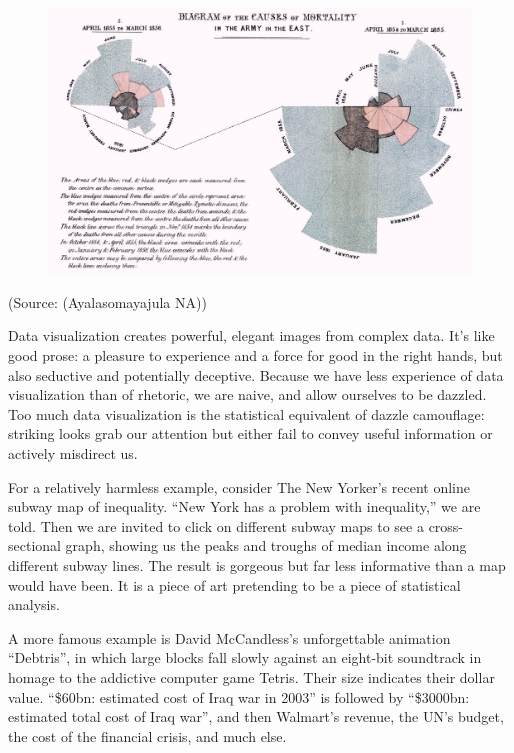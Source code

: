 \documentclass[]{book}
\theoremstyle{definition}
\theoremstyle{definition}
\theoremstyle{definition}
\theoremstyle{remark}
\begin{document}
\begin{figure}
\centering
\includegraphics{images/aya-polar.jpg}
\caption{}
\end{figure}

(Source: (Ayalasomayajula NA))

Data visualization creates powerful, elegant images from complex data.
It's like good prose: a pleasure to experience and a force for good in
the right hands, but also seductive and potentially deceptive. Because
we have less experience of data visualization than of rhetoric, we are
naive, and allow ourselves to be dazzled. Too much data visualization is
the statistical equivalent of dazzle camouflage: striking looks grab our
attention but either fail to convey useful information or actively
misdirect us.

For a relatively harmless example, consider The New Yorker's recent
online subway map of inequality. ``New York has a problem with
inequality,'' we are told. Then we are invited to click on different
subway maps to see a cross-sectional graph, showing us the peaks and
troughs of median income along different subway lines. The result is
gorgeous but far less informative than a map would have been. It is a
piece of art pretending to be a piece of statistical analysis.

A more famous example is David McCandless's unforgettable animation
``Debtris'', in which large blocks fall slowly against an eight-bit
soundtrack in homage to the addictive computer game Tetris. Their size
indicates their dollar value. ``\$60bn: estimated cost of Iraq war in
2003'' is followed by ``\$3000bn: estimated total cost of Iraq war'',
and then Walmart's revenue, the UN's budget, the cost of the financial
crisis, and much else.
\end{document}
